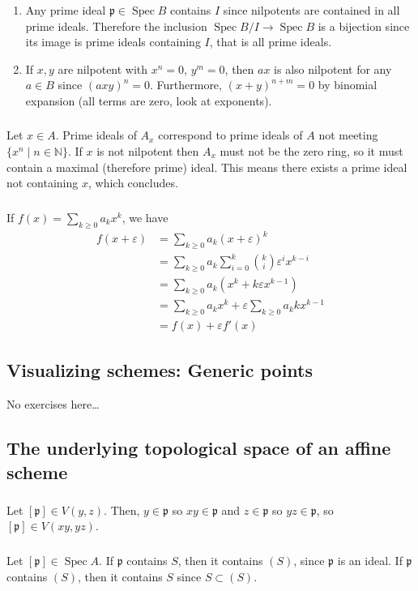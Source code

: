 \documentclass{article}
\newcommand{\N}{\mathbb{N}}
\DeclareMathOperator{\Spec}{Spec}
\newcommand{\p}{\mathfrak{p}}
\newcommand{\exercise}{\subsubsection} %
\begin{document}
\exercise{} \begin{enumerate}
    \item Any prime ideal $\p \in \Spec B$ contains $I$ since nilpotents are contained in all prime ideals. Therefore the inclusion $\Spec B/I \to \Spec B$ is a bijection since its image is prime ideals containing $I$, that is all prime ideals.
    \item If $x,y$ are nilpotent with $x^n = 0$, $y^m = 0$, then $ax$ is also nilpotent for any $a \in B$ since $(axy)^n = 0$. Furthermore, $(x+y)^{n+m} = 0$ by binomial expansion (all terms are zero, look at exponents).
\end{enumerate}

\exercise{} Let $x \in A$. Prime ideals of $A_x$ correspond to prime ideals of $A$ not meeting $\{x^n \mid n\in \N\}$. If $x$ is not nilpotent then $A_x$ must not be the zero ring, so it must contain a maximal (therefore prime) ideal. This means there exists a prime ideal not containing $x$, which concludes.

\exercise{} If $f(x) = \sum_{k \ge 0} a_k x^k$, we have
\begin{align*}
    f(x + \varepsilon) & = \sum_{k \ge 0} a_k (x+\varepsilon)^k \\
    & = \sum_{k \ge 0} a_k \sum_{i=0}^k \binom{k}{i} \varepsilon^i x^{k-i} \\
    & = \sum_{k \ge 0} a_k (x^k + k \varepsilon x^{k-1}) \\
    & = \sum_{k \ge 0} a_k x^k + \varepsilon \sum_{k \ge 0} a_k k x^{k-1} \\
    & = f(x) + \varepsilon f'(x)
\end{align*}

\subsection{Visualizing schemes: Generic points}

No exercises here\dots

\subsection{The underlying topological space of an affine scheme}

\exercise{} Let $[\p] \in V(y,z)$. Then, $y \in \p$ so $xy \in \p$ and $z \in \p$ so $yz \in \p$, so $[\p] \in V(xy,yz)$.

\exercise{} Let $[\p] \in \Spec A$. If $\p$ contains $S$, then it contains $(S)$, since $\p$ is an ideal. If $\p$ contains $(S)$, then it contains $S$ since $S \subset (S)$.
\end{document}
